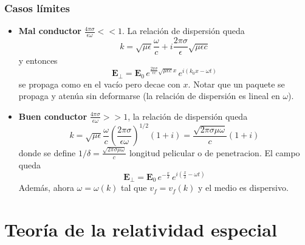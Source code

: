 

\subsubsection{Casos límites}
\begin{itemize}
    \item \textbf{Mal conductor} $\frac{4\pi\sigma}{\epsilon\omega} << 1$. La relación de dispersión queda 
    \begin{equation*}
        k = \sqrt{\mu\epsilon}\frac{\omega}{c} 
        + i\frac{2\pi\sigma}{\epsilon}\sqrt{\mu\epsilon c}
    \end{equation*}
    y entonces
    \begin{equation*}
        \textbf{E}_{\perp} = \textbf{E}_{0}
        \,e^{\frac{2\pi\sigma}{\epsilon c}\sqrt{\mu \epsilon c}x}
        \,e^{i(k_{0}x - \omega t)}
    \end{equation*}
    se propaga como en el vacío pero decae con $x$. Notar que un paquete se propaga y atenúa sin deformarse (la relación de dispersión es lineal en $\omega$).
    \item \textbf{Buen conductor} $\frac{4\pi\sigma}{\epsilon\omega} >> 1$, la relación de dispersión queda
    \begin{equation*}
        k = \sqrt{\mu \epsilon}\frac{\omega}{c}
        \left(
            \frac{2\pi\sigma}{\epsilon\omega}
        \right)^{1/2}(1+i)
        = \frac{\sqrt{2\pi\sigma\mu\omega}}{c}(1+i)
    \end{equation*}
    donde se define $1/\delta = \frac{\sqrt{2\pi\sigma\mu\omega}}{c}$ longitud pelicular o de penetracion. El campo queda
    \begin{equation*}
        \textbf{E}_{\perp} = \textbf{E}_{0}\,
        e^{-\frac{x}{\delta}}\,
        e^{i\left(\frac{x}{\delta} - \omega t\right)}
    \end{equation*}
    Además, ahora $\omega = \omega(k)$ tal que $v_{f} = v_{f}(k)$ y el medio es dispersivo.
\end{itemize}



\newpage
\section{Teoría de la relatividad especial}


